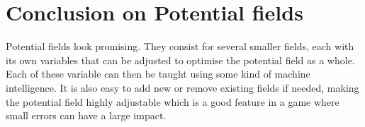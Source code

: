 \section{Conclusion on Potential fields}
	Potential fields look promising. They consist for several smaller fields, each with its own variables that can be adjusted to optimise the potential field as a whole. Each of these variable can then be taught using some kind of machine intelligence. It is also easy to add new or remove existing fields if needed, making the potential field highly adjustable which is a good feature in a game where small errors can have a large impact.